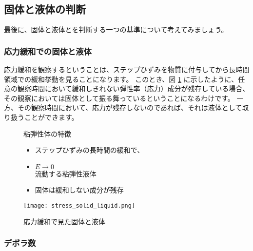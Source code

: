 \documentclass[uplatex,dvipdfmx,a4paper,11pt]{jsarticle}
\begin{document}
\subsection{固体と液体の判断}
最後に、固体と液体とを判断する一つの基準について考えてみましょう。

\subsubsection{応力緩和での固体と液体}
応力緩和を観察するということは、ステップひずみを物質に付与してから長時間領域での緩和挙動を見ることになります。
このとき、図 \ref{fig:kotaitoekitai} に示したように、任意の観察時間において緩和しきれない弾性率（応力）成分が残存している場合、
その観察においては固体として振る舞っているということになるわけです。
一方、その観察時間において、応力が残存しないのであれば、それは液体として取り扱うことができます。

\begin{figure}[htb]
	\begin{center}
		\begin{minipage}{0.45\textwidth}
			\begin{itembox}[l]{粘弾性体の特徴}
				\begin{itemize}
					\item ステップひずみの長時間の緩和で、
					\item $E \rightarrow 0$\\
					流動する粘弾性液体
					\item 固体は緩和しない成分が残存
				\end{itemize}
			\end{itembox}
		\end{minipage}
		\begin{minipage}{0.45\textwidth}
			\begin{center}
			\texttt{[image: stress\_solid\_liquid.png]}
			\end{center}
		\end{minipage}
		\caption{応力緩和で見た固体と液体}
		\label{fig:kotaitoekitai}
	\end{center}
\end{figure}

\subsubsection{デボラ数}
\end{document}
